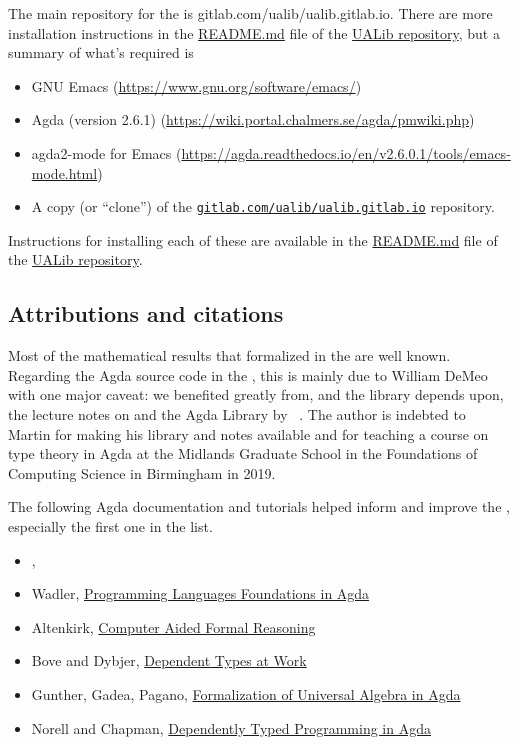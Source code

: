 The main repository for the \agdaualib is gitlab.com/ualib/ualib.gitlab.io. There are more installation instructions in the \href{https://gitlab.com/ualib/ualib.gitlab.io/README.md}{README.md} file of the \href{https://gitlab.com/ualib/ualib.gitlab.io}{UALib repository}, but a summary of what's required is
\begin{itemize}
\item GNU Emacs (\url{https://www.gnu.org/software/emacs/})
\item Agda (version 2.6.1) (\url{https://wiki.portal.chalmers.se/agda/pmwiki.php})
\item agda2-mode for Emacs (\url{https://agda.readthedocs.io/en/v2.6.0.1/tools/emacs-mode.html})
\item A copy (or ``clone'') of the \href{https://gitlab.com/ualib/ualib.gitlab.io}{\texttt{gitlab.com/ualib/ualib.gitlab.io}} repository.
\end{itemize}

Instructions for installing each of these are available in the \href{https://gitlab.com/ualib/ualib.gitlab.io/README.md}{README.md} file of the \href{https://gitlab.com/ualib/ualib.gitlab.io}{UALib repository}.

\subsection*{Attributions and citations}

Most of the mathematical results that formalized in the \ualib are well known. Regarding the Agda source code in the \agdaualib, this is mainly due to William DeMeo with one major caveat: we benefited greatly from, and the library depends upon, the lecture notes on \ufcourse and the \typetopology Agda Library by \escardo~\cite{MHE}. The author is indebted to Martin for making his library and notes available and for teaching a course on type theory in Agda at the Midlands Graduate School in the Foundations of Computing Science in Birmingham in 2019.

The following Agda documentation and tutorials helped inform and improve the \ualib, especially the first one in the list.

\begin{itemize}
\item \escardo, \ufcourse
\item Wadler, \href{https://plfa.github.io/}{Programming Languages Foundations in Agda}
\item Altenkirk, \href{http://www.cs.nott.ac.uk/~psztxa/g53cfr/}{Computer Aided Formal Reasoning}
\item Bove and Dybjer, \href{http://www.cse.chalmers.se/~peterd/papers/DependentTypesAtWork.pdf}{Dependent Types at Work}
\item Gunther, Gadea, Pagano, \href{http://www.sciencedirect.com/science/article/pii/S1571066118300768}{Formalization of Universal Algebra in Agda}
\item Norell and Chapman, \href{http://www.cse.chalmers.se/~ulfn/papers/afp08/tutorial.pdf}{Dependently Typed Programming in Agda}
\end{itemize}



